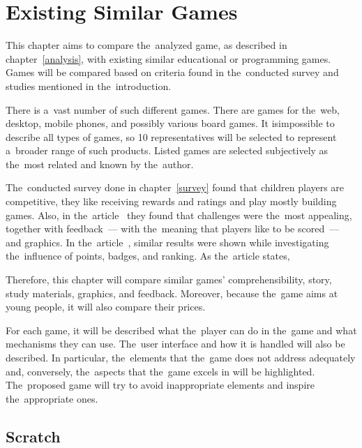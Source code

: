 \chapter{Existing Similar Games}
\label{competitive-games}

This chapter aims to compare the~analyzed game, as described in chapter~\ref{analysis}, with existing similar educational or programming games.
Games will be compared based on criteria found in the~conducted survey and studies mentioned in the~introduction.

There is a~vast number of such different games.
There are games for the~web, desktop, mobile phones, and possibly various board games.
It is\linebreak{}impossible to describe all types of games, so 10 representatives will be selected to represent a~broader range of such products.
Listed games are selected subjectively as the~most related and known by the~author.

The~conducted survey done in chapter~\ref{survey} found that children players are competitive, they like receiving rewards and ratings and play mostly building games.
Also, in the~article~\cite{nand_2019_engaging} they found that challenges were the~most appealing, together with feedback~--- with the~meaning that players like to be scored~--- and graphics.
In the~article~\cite{smiderle_2020_the}, similar results were shown while investigating the~influence of points, badges, and ranking.
As the~article states, 

Therefore, this chapter will compare similar games' comprehensibility, story, study materials, graphics, and feedback.
Moreover, because the~game \emph{\myAppName} aims at young people, it will also compare their prices.

For each game, it will be described what the~player can do in the~game and what mechanisms they can use.
The~user interface and how it is handled will also be described.
In particular, the~elements that the~game does not address adequately and, conversely, the~aspects that the~game excels in will be highlighted.
The~proposed game will try to avoid inappropriate elements and inspire the~appropriate ones.

\pagebreak
\section{Scratch}
\label{similar-games:scratch}

